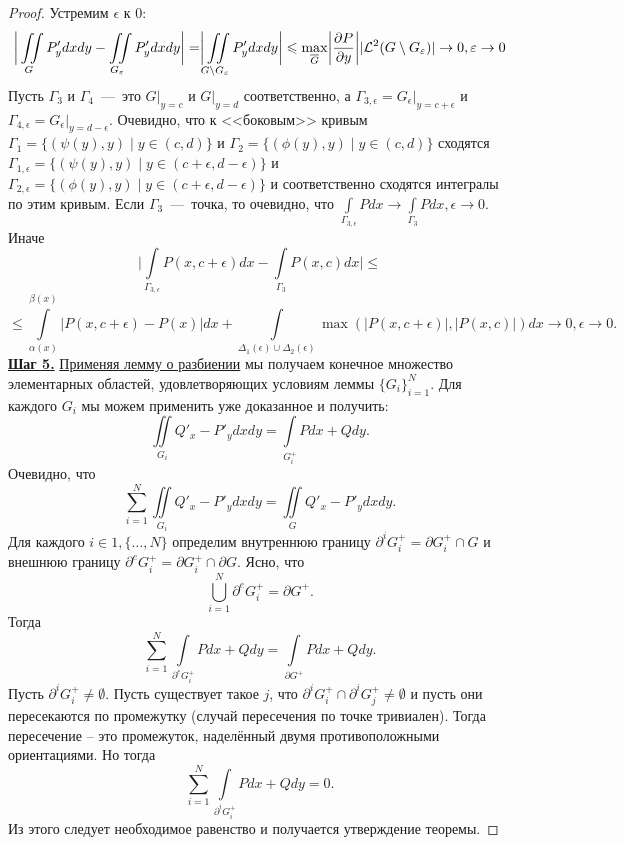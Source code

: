 \begin{proof}
    Устремим $\epsilon$ к 0: \[\biggr|\iint\limits_G P'_ydxdy - \iint\limits_{G_{\varepsilon}} P'_ydxdy\biggr| = \biggr|\iint\limits_{G \setminus G_{\varepsilon}}P'_ydxdy\biggr| \leqslant \max\limits_{\overline{G}}\biggr|\dfrac{\partial P}{\partial y}\biggr||\mathcal{L}^2(G \setminus G_{\varepsilon})| \rightarrow 0, \varepsilon \rightarrow 0\]
    Пусть $\Gamma_3$ и $\Gamma_4$~---~это $G|_{y = c}$ и $G|_{y = d}$ соответственно, а $\Gamma_{3, \epsilon} = G_\epsilon|_{y = c + \epsilon}$ и $\Gamma_{4, \epsilon} = G_\epsilon|_{y = d - \epsilon}$. Очевидно, что к <<боковым>> кривым $\Gamma_1 = \{(\psi(y), y) \mid y \in (c, d)\}$ и $\Gamma_2 = \{(\phi(y), y) \mid y \in (c, d)\}$ сходятся $\Gamma_{1, \epsilon} = \{(\psi(y), y) \mid y \in (c + \epsilon, d - \epsilon)\}$ и $\Gamma_{2, \epsilon} = \{(\phi(y), y) \mid y \in (c + \epsilon, d - \epsilon)\}$ и соответственно сходятся интегралы по этим кривым. Если $\Gamma_3$~---~точка, то очевидно, что $\int\limits_{\Gamma_{3, \epsilon}} Pdx \rightarrow \int\limits_{\Gamma_{3}} Pdx, \epsilon \rightarrow 0$. Иначе \[\biggr|\int\limits_{\Gamma_{3, \epsilon}}P(x, c + \epsilon)dx - \int\limits_{\Gamma_3}P(x, c)dx\biggr| \leq \]\[ \leq \int\limits_{\alpha(x)}^{\beta(x)} |P(x, c + \epsilon) - P(x)|dx + \int\limits_{\Delta_1(\epsilon) \cup \Delta_2(\epsilon)} \max(|P(x, c + \epsilon)|, |P(x, c)|)dx \rightarrow 0, \epsilon \rightarrow 0.\]
    \textbf{\underline{Шаг 5.}} \hyperlink{lemma_8_6}{Применяя лемму о разбиении} мы получаем конечное множество элементарных областей, удовлетворяющих условиям леммы $\{G_i\}_{i = 1}^N$. Для каждого $G_i$ мы можем применить уже доказанное и получить: \[\iint\limits_{G_i} Q'_x - P'_ydxdy = \int\limits_{G_i^+} Pdx+Qdy.\]
    Очевидно, что \[\sum\limits_{i = 1}^N \iint\limits_{G_i} Q'_x - P'_ydxdy = \iint\limits_G Q'_x - P'_ydxdy.\]
    Для каждого $i \in 1, \{\ldots, N\}$ определим внутреннюю границу $\partial^iG_i^+ = \partial G_i^+ \cap G$ и внешнюю границу $\partial^e G_i^+ = \partial G_i^+ \cap \partial G$. Ясно, что \[\bigcup\limits_{i = 1}^N \partial^e G_i^+ = \partial G^+.\]
    Тогда \[\sum\limits_{i = 1}^N \int\limits_{\partial^e G_i^+} Pdx + Qdy = \int\limits_{\partial G^+} Pdx + Qdy.\]
    Пусть $\partial^i G_i^+ \neq \emptyset$. Пусть существует такое $j$, что $\partial^iG_i^+ \cap \partial^i G_j^+ \neq \emptyset$ и пусть они пересекаются по промежутку (случай пересечения по точке тривиален). Тогда пересечение -- это промежуток, наделённый двумя противоположными ориентациями. Но тогда \[\sum\limits_{i = 1}^N \int\limits_{\partial^i G_i^+} Pdx + Qdy = 0.\]
    Из этого следует необходимое равенство и получается утверждение теоремы.

\end{proof}
